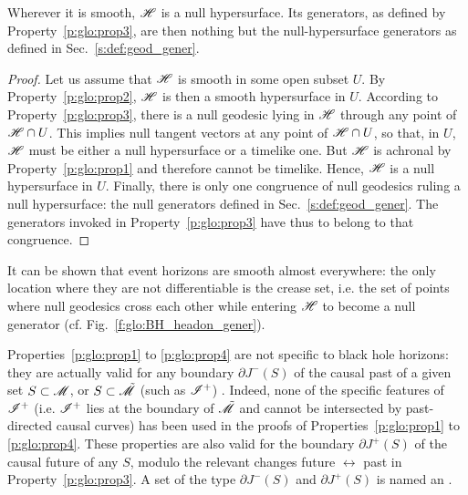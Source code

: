 \begin{prop}
\label{p:glo:prop4}
Wherever it is smooth, $\mathscr{H}$ is a null hypersurface.
Its generators,
as defined by Property~\ref{p:glo:prop3}, are then nothing but the
null-hypersurface generators as defined in Sec.~\ref{s:def:geod_gener}.
\end{prop}

\begin{proof}
Let us assume that $\mathscr{H}$ is smooth in some open subset $U$.
By Property~\ref{p:glo:prop2}, $\mathscr{H}$ is then a smooth hypersurface in $U$.
According to Property~\ref{p:glo:prop3}, there is a null geodesic lying in $\mathscr{H}$ through
any point of $\mathscr{H}\cap U$.
This implies null tangent vectors at any point of $\mathscr{H}\cap U$, so that, in $U$,
$\mathscr{H}$ must be either a null hypersurface or a timelike one. But $\mathscr{H}$ is achronal by Property~\ref{p:glo:prop1} and therefore cannot be timelike. Hence, $\mathscr{H}$ is a null hypersurface in $U$.
Finally, there is only one congruence of null geodesics ruling a null hypersurface: the
null generators defined in Sec.~\ref{s:def:geod_gener}. The generators invoked in
Property~\ref{p:glo:prop3} have thus to belong to that congruence.
\end{proof}

It can be shown that event horizons are smooth almost everywhere: the only
location where they are not differentiable is the crease set, i.e. the set of points
where null geodesics cross each other while entering $\mathscr{H}$ to become a null
generator (cf. Fig.~\ref{f:glo:BH_headon_gener}).

\begin{remark}
\label{r:glo:achronal_boundaries}
Properties~\ref{p:glo:prop1} to \ref{p:glo:prop4} are not specific to black hole horizons: they are actually
valid for any boundary $\partial J^-(S)$ of the causal past of a given set $S\subset\mathscr{M}$,
or $S\subset\tilde{\mathscr{M}}$ (such as $\mathscr{I}^+$) \cite{Penro68,HawkiE73,Gallo04}. Indeed, none of the
specific features of $\mathscr{I}^+$ (i.e. $\mathscr{I}^+$ lies at the boundary of $\tilde{\mathscr{M}}$ and cannot be intersected by past-directed causal curves) has been used in the proofs of
Properties~\ref{p:glo:prop1} to \ref{p:glo:prop4}.
These properties are also valid for the boundary $\partial J^+(S)$ of the causal future of any
$S$, modulo the relevant changes future $\leftrightarrow$ past in Property~\ref{p:glo:prop3}.
A set of the type $\partial J^-(S)$ and $\partial J^+(S)$ is named an
\cite{HawkiE73}.
\end{remark}



